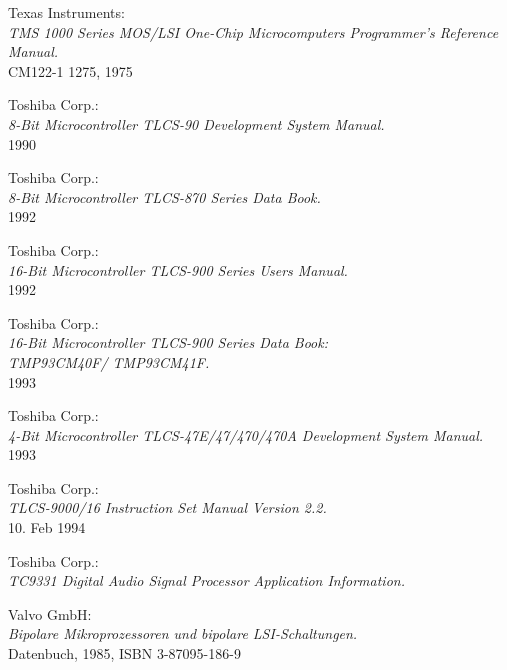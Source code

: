  Texas Instruments: \\
                     {\em TMS 1000 Series MOS/LSI One-Chip
                     Microcomputers Programmer's Reference
                     Manual.\/} \\
                     CM122-1 1275, 1975

 Toshiba Corp.: \\
                 {\em 8-Bit Microcontroller TLCS-90 Development System
                 Manual.\/} \\
                 1990

 Toshiba Corp.: \\
                  {\em 8-Bit Microcontroller TLCS-870 Series Data
                  Book.\/} \\
                  1992

 Toshiba Corp.: \\
                  {\em 16-Bit Microcontroller TLCS-900 Series Users
                  Manual.\/} \\
                  1992

 Toshiba Corp.: \\
                   {\em 16-Bit Microcontroller TLCS-900 Series Data Book: \\
                    TMP93CM40F/ TMP93CM41F.\/} \\
                   1993

 Toshiba Corp.: \\
                 {\em 4-Bit Microcontroller TLCS-47E/47/470/470A Development
                  System Manual.\/} \\
                 1993

 Toshiba Corp.: \\
                   {\em TLCS-9000/16 Instruction Set Manual Version
                   2.2.\/} \\
                   10. Feb 1994

 Toshiba Corp.: \\
                   {\em TC9331 Digital Audio Signal Processor
                   Application Information.}

 Valvo GmbH: \\
                {\em Bipolare Mikroprozessoren und bipolare
                LSI-Schaltungen.\/} \\
                Datenbuch, 1985, ISBN 3-87095-186-9

